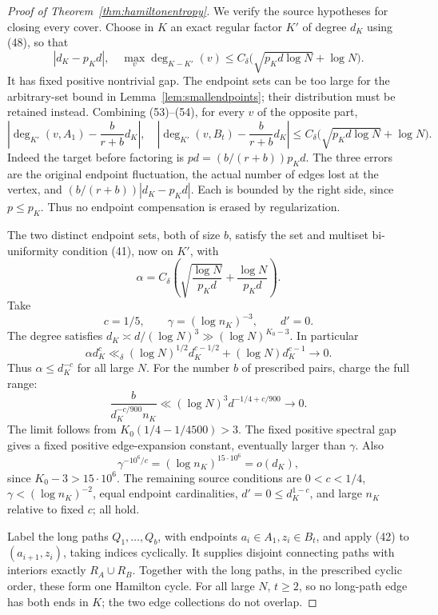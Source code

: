 \begin{proof}[Proof of Theorem~\ref{thm:hamiltonentropy}]
We verify the source hypotheses for closing every cover.
Choose in \(K\) an exact regular factor \(K'\) of degree \(d_K\)
using (48), so that
\[
 |d_K-p_Kd|,\quad
 \max_v\deg_{K-K'}(v)
       \leq C_\delta\bigl(\sqrt{p_Kd\log N}+\log N\bigr).
 \tag{54}
\]
It has fixed positive nontrivial gap.
The endpoint sets can be too large for the arbitrary-set
bound in Lemma~\ref{lem:smallendpoints}; their distribution
must be retained instead.
Combining (53)--(54), for every \(v\) of the opposite part,
\[
 \left|\deg_{K'}(v,A_1)-\frac b{r+b}d_K\right|,
 \quad
 \left|\deg_{K'}(v,B_t)-\frac b{r+b}d_K\right|
 \leq C_\delta\bigl(\sqrt{p_Kd\log N}+\log N\bigr).           \tag{55}
\]
Indeed the target before factoring is \(pd=(b/(r+b))p_Kd\).
The three errors are the original endpoint fluctuation,
the actual number of edges lost at the vertex, and
\((b/(r+b))|d_K-p_Kd|\).
Each is bounded by the right side, since \(p\leq p_K\).
Thus no endpoint compensation is erased by regularization.

The two distinct endpoint sets, both of size \(b\), satisfy
the set and multiset bi-uniformity condition (41), now on
\(K'\), with
\[
 \alpha=C_\delta\left(
       \sqrt{\frac{\log N}{p_Kd}}+\frac{\log N}{p_Kd}\right).
\]
Take
\[
 c=1/5,\qquad \gamma=(\log n_K)^{-3},\qquad d'=0 .
\]
The degree satisfies
\(d_K\asymp d/(\log N)^3\gg(\log N)^{K_0-3}\).
In particular
\[
 \alpha d_K^c
 \ll_\delta(\log N)^{1/2}d_K^{c-1/2}
                       +(\log N)d_K^{c-1}\longrightarrow0.
\]
Thus \(\alpha\leq d_K^{-c}\) for all large \(N\).
For the number \(b\) of prescribed pairs, charge the full range:
\[
 \frac{b}{d_K^{-c/900}n_K}
 \ll (\log N)^3 d^{-1/4+c/900}\longrightarrow0.
 \tag{56}
\]
The limit follows from \(K_0(1/4-1/4500)>3\).
The fixed positive spectral gap gives a fixed positive
edge-expansion constant, eventually larger than \(\gamma\).
Also
\[
 \gamma^{-10^6/c}=(\log n_K)^{15\cdot10^6}
                   =o(d_K),
\]
since \(K_0-3>15\cdot10^6\).
The remaining source conditions are
\(0<c<1/4\), \(\gamma<(\log n_K)^{-2}\), equal endpoint
cardinalities, \(d'=0\leq d_K^{1-c}\), and large \(n_K\)
relative to fixed \(c\); all hold.

Label the long paths \(Q_1,\ldots,Q_b\), with endpoints
\(a_i\in A_1,z_i\in B_t\), and apply (42) to
\((a_{i+1},z_i)\), taking indices cyclically.
It supplies disjoint connecting paths with interiors
exactly \(R_A\cup R_B\).
Together with the long paths, in the prescribed cyclic order,
these form one Hamilton cycle.
For all large \(N\), \(t\geq2\), so no long-path edge has both
ends in \(K\); the two edge collections do not overlap.


\end{proof}
